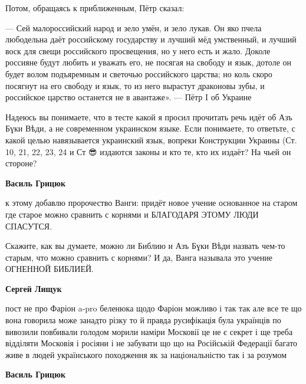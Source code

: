 \begin{itemize}
\begin{itemize}
Потом, обращаясь к приближенным, Пётр сказал:


— Сей малороссийский народ и зело умён, и зело лукав. Он яко пчела любодельна
даёт российскому государству и лучший мёд умственный, и лучший воск для свещи
российского просвещения, но у него есть и жало. Доколе россияне будут любить и
уважать его, не посягая на свободу и язык, дотоле он будет волом подъяремным и
светочью российского царства; но коль скоро посягнут на его свободу и язык, то
из него вырастут драконовы зубы, и российское царство останется не в авантаже».
— Пётр I об Украине

Надеюсь вы понимаете, что в тесте какой я просил прочитать речь идёт об Азъ
Бɣки Вѣди, а не современном украинском языке. Если понимаете, то ответьте, с
какой целью навязывается украинский язык, вопреки Конструкции Украины (Ст. 10,
21, 22, 23, 24 и Ст 😎 издаются законы и кто те, кто их издаёт? На чьей он
стороне?

 
\textbf{Василь Грицюк} 

к этому добавлю пророчество Ванги: придёт новое учение основанное на старом где
старое можно сравнить с корнями и БЛАГОДАРЯ ЭТОМУ ЛЮДИ СПАСУТСЯ.

Скажите, как вы думаете, можно ли Библию и Азъ Бɣки Вѣди назвать чем-то старым,
что можно сравнить с корнями? И да, Ванга называла это учение ОГНЕННОЙ БИБЛИЕЙ.

 
\textbf{Сергей Лищук} 

пост не про Фаріон a-pro беленюка щодо Фаріон можливо і так так але все те що
вона говорила може занадто різку то й правда русифікація була українців по
вивозили повбивали голодом морили наміри Московії це не є секрет і ще треба
відділяти Московія і росіяни і не забувати що що на Російській Федерації багато
живе в людей українського походження як за національністю так і за розумом


\textbf{Василь Грицюк} 


\end{itemize}
\end{itemize}
